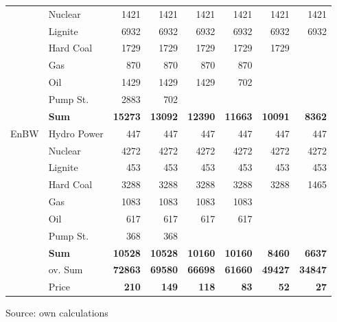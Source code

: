 \begin{table}[htb]
\begin{tabular}{llrrrrrr}
           &    Nuclear &       1421 &       1421 &       1421 &       1421 &       1421 &       1421 \\

           &    Lignite &       6932 &       6932 &       6932 &       6932 &       6932 &       6932 \\

           &  Hard Coal &       1729 &       1729 &       1729 &       1729 &       1729 &            \\

           &        Gas &        870 &        870 &        870 &        870 &            &            \\

           &        Oil &       1429 &       1429 &       1429 &        702 &            &            \\

           &   Pump St. &       2883 &        702 &            &            &            &            \\

           &  {\bf Sum} & {\bf 15273} & {\bf 13092} & {\bf 12390} & {\bf 11663} & {\bf 10091} & {\bf 8362} \\
\hline
      EnBW & Hydro Power &        447 &        447 &        447 &        447 &        447 &        447 \\

           &    Nuclear &       4272 &       4272 &       4272 &       4272 &       4272 &       4272 \\

           &    Lignite &        453 &        453 &        453 &        453 &        453 &        453 \\

           &  Hard Coal &       3288 &       3288 &       3288 &       3288 &       3288 &       1465 \\

           &        Gas &       1083 &       1083 &       1083 &       1083 &            &            \\

           &        Oil &        617 &        617 &        617 &        617 &            &            \\

           &   Pump St. &        368 &        368 &            &            &            &            \\

           &  {\bf Sum} & {\bf 10528} & {\bf 10528} & {\bf 10160} & {\bf 10160} & {\bf 8460} & {\bf 6637} \\
\hline
           &    ov. Sum & {\bf 72863} & {\bf 69580} & {\bf 66698} & {\bf 61660} & {\bf 49427} & {\bf 34847} \\
\hline
           &      Price &  {\bf 210} &  {\bf 149} &  {\bf 118} &   {\bf 83} &   {\bf 52} &   {\bf 27} \\
\hline
\hline
\end{tabular}
\label{tab:statquant}
\begin{center}
Source: own calculations
\end{center}
\end{table}

